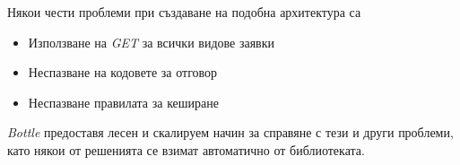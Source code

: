 		Някои чести проблеми при създаване на подобна архитектура са\cite{Vitvar}
		
		\begin{itemize}
			\item Използване на \emph{GET} за всички видове заявки
			\item Неспазване на кодовете за отговор
			\item Неспазване правилата за кеширане
		\end{itemize}
		
		\emph{Bottle} предоставя лесен и скалируем начин за справяне с тези и други проблеми, като някои от решенията се взимат автоматично от библиотеката.
		